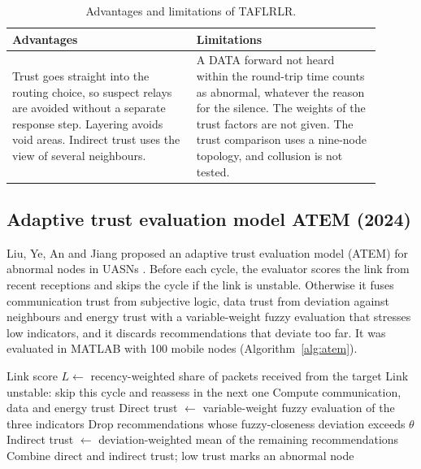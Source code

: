 \documentclass{article}
\begin{document}
\begin{table}[htbp]
\centering\footnotesize\renewcommand{\arraystretch}{1.1}
\begin{tabular}{|p{0.45\linewidth}|p{0.45\linewidth}|}
\hline
\textbf{Advantages} & \textbf{Limitations} \\
\hline
Trust goes straight into the routing choice, so suspect relays are avoided without a separate response step. Layering avoids void areas. Indirect trust uses the view of several neighbours. & A DATA forward not heard within the round-trip time counts as abnormal, whatever the reason for the silence. The weights of the trust factors are not given. The trust comparison uses a nine-node topology, and collusion is not tested. \\
\hline
\end{tabular}
\caption{Advantages and limitations of TAFLRLR.}
\end{table}

\subsection{Adaptive trust evaluation model ATEM (2024)}\label{sec:atem}
\noindent
Liu, Ye, An and Jiang proposed an adaptive trust evaluation model (ATEM) for abnormal nodes in UASNs \cite{liu2024}. Before each cycle, the evaluator scores the link from recent receptions and skips the cycle if the link is unstable. Otherwise it fuses communication trust from subjective logic, data trust from deviation against neighbours and energy trust with a variable-weight fuzzy evaluation that stresses low indicators, and it discards recommendations that deviate too far. It was evaluated in MATLAB with 100 mobile nodes (Algorithm~\ref{alg:atem}).

\begin{algorithm}[htbp]
\small
\caption{One trust cycle of ATEM}\label{alg:atem}
\begin{algorithmic}[1]
\State Link score $L \gets$ recency-weighted share of packets received from the target
  \State Link unstable: skip this cycle and reassess in the next one
\Else
  \State Compute communication, data and energy trust
  \State Direct trust $\gets$ variable-weight fuzzy evaluation of the three indicators
  \State Drop recommendations whose fuzzy-closeness deviation exceeds $\theta$
  \State Indirect trust $\gets$ deviation-weighted mean of the remaining recommendations
  \State Combine direct and indirect trust; low trust marks an abnormal node
\EndIf
\end{algorithmic}
\end{algorithm}
\end{document}
